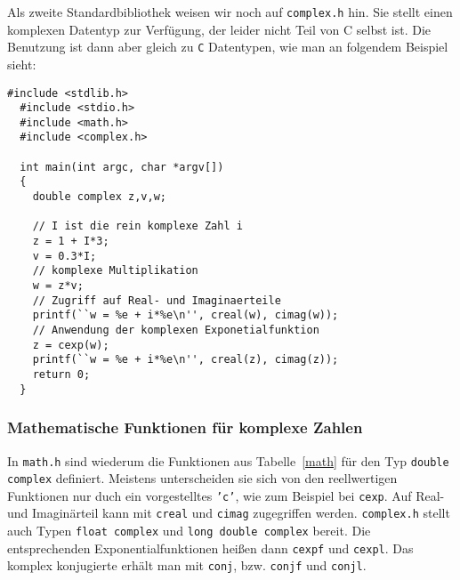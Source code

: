 Als zweite Standardbibliothek weisen wir noch auf \texttt{complex.h} hin.
Sie stellt einen komplexen Datentyp zur Verfügung, der leider nicht Teil von C selbst ist.
Die Benutzung ist dann aber gleich zu \texttt{C} Datentypen, wie man an folgendem Beispiel sieht:
\begin{lstlisting}[caption={Beispiel für komplexe Zahlen}, belowcaptionskip=0.3em]
  #include <stdlib.h>
  #include <stdio.h>
  #include <math.h>
  #include <complex.h>
  
  int main(int argc, char *argv[])
  {
    double complex z,v,w;

    // I ist die rein komplexe Zahl i
    z = 1 + I*3;
    v = 0.3*I;
    // komplexe Multiplikation
    w = z*v;
    // Zugriff auf Real- und Imaginaerteile
    printf(``w = %e + i*%e\n'', creal(w), cimag(w));
    // Anwendung der komplexen Exponetialfunktion
    z = cexp(w);
    printf(``w = %e + i*%e\n'', creal(z), cimag(z));
    return 0;
  }
\end{lstlisting}

\subsubsection{Mathematische Funktionen für komplexe Zahlen}

In \texttt{math.h} sind wiederum die Funktionen aus Tabelle~\ref{math} für den Typ \texttt{double complex} definiert.
Meistens unterscheiden sie sich von den reellwertigen Funktionen nur duch ein vorgestelltes \texttt{'c'}, wie zum Beispiel bei \texttt{cexp}.
Auf Real- und Imaginärteil kann mit \texttt{creal} und \texttt{cimag} zugegriffen werden.
\texttt{complex.h} stellt auch Typen \texttt{float complex} und \texttt{long double complex} bereit.
Die entsprechenden Exponentialfunktionen heißen dann \texttt{cexpf} und \texttt{cexpl}.
Das komplex konjugierte erhält man mit \texttt{conj}, bzw. \texttt{conjf} und \texttt{conjl}.

